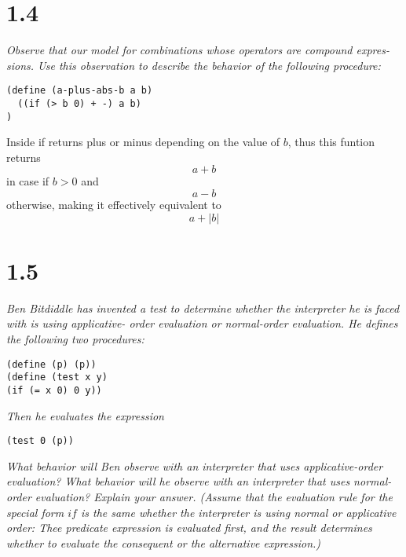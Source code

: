 \documentclass[11pt,oneside,titlepage]{book}
\begin{document}
\section*{1.4}

\textit{Observe that our model for combinations whose operators are compound expres-
sions. Use this observation to describe the behavior of the
following procedure:}

\begin{verbatim}
(define (a-plus-abs-b a b)
  ((if (> b 0) + -) a b)
)
\end{verbatim}

Inside if returns plus or minus depending on the value of $b$, thus this funtion returns
$$a + b$$
in case if $b > 0$
and
$$a - b$$
otherwise, making it effectively equivalent to
$$a + |b|$$

\section*{1.5}
\textit{ Ben Bitdiddle has invented a test to determine
whether the interpreter he is faced with is using applicative-
order evaluation or normal-order evaluation. He defines the
following two procedures:}
\begin{verbatim}
(define (p) (p))
(define (test x y)
(if (= x 0) 0 y))
\end{verbatim}
\textit{Then he evaluates the expression}
\begin{verbatim}
(test 0 (p))
\end{verbatim}
\textit{What behavior will Ben observe with an interpreter that
uses applicative-order evaluation? What behavior will he
observe with an interpreter that uses normal-order evaluation?
Explain your answer. (Assume that the evaluation
rule for the special form $if$ is the same whether the interpreter
is using normal or applicative order: Thee predicate
expression is evaluated first, and the result determines
whether to evaluate the consequent or the alternative expression.)
}
\end{document}
